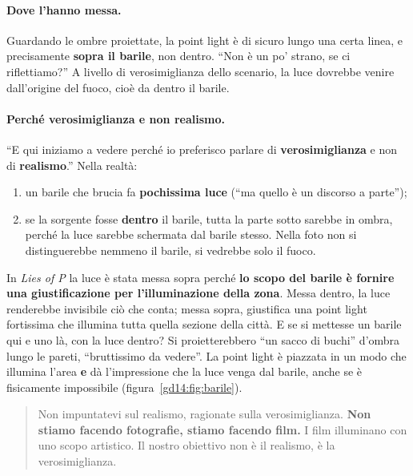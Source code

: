 \paragraph{Dove l'hanno messa.} Guardando le ombre proiettate, la point light è di
sicuro lungo una certa linea, e precisamente \textbf{sopra il barile}, non dentro.
``Non è un po' strano, se ci riflettiamo?'' A livello di verosimiglianza dello
scenario, la luce dovrebbe venire dall'origine del fuoco, cioè da dentro il barile.

\paragraph{Perché verosimiglianza e non realismo.} ``E qui iniziamo a vedere perché
io preferisco parlare di \textbf{verosimiglianza} e non di \textbf{realismo}.'' Nella
realtà:
\begin{enumerate}
  \item un barile che brucia fa \textbf{pochissima luce} (``ma quello è un discorso
        a parte'');
  \item se la sorgente fosse \textbf{dentro} il barile, tutta la parte sotto
        sarebbe in ombra, perché la luce sarebbe schermata dal barile stesso. Nella
        foto non si distinguerebbe nemmeno il barile, si vedrebbe solo il fuoco.
\end{enumerate}
In \emph{Lies of P} la luce è stata messa sopra perché \textbf{lo scopo del barile è
fornire una giustificazione per l'illuminazione della zona}. Messa dentro, la
luce renderebbe invisibile ciò che conta; messa sopra, giustifica una point light
fortissima che illumina tutta quella sezione della città. E se si mettesse un
barile qui e uno là, con la luce dentro? Si proietterebbero ``un sacco di buchi''
d'ombra lungo le pareti, ``bruttissimo da vedere''. La point light è piazzata in un
modo che illumina l'area \textbf{e} dà l'impressione che la luce venga dal barile,
anche se è fisicamente impossibile (figura~\ref{gd14:fig:barile}).

\begin{quote}
Non impuntatevi sul realismo, ragionate sulla verosimiglianza. \textbf{Non stiamo
facendo fotografie, stiamo facendo film.} I film illuminano con uno scopo
artistico. Il nostro obiettivo non è il realismo, è la verosimiglianza.
\end{quote}

